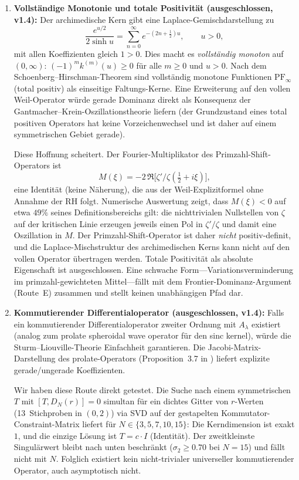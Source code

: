 ﻿\documentclass[12pt,a4paper]{article}
\theoremstyle{definition}
\theoremstyle{remark}
\begin{document}
\begin{enumerate}[label=(\Alph*)]
  \item \textbf{Vollständige Monotonie und totale Positivität (ausgeschlossen, v1.4):} Der archimedische Kern gibt eine Laplace-Gemischdarstellung zu
  \[ \frac{e^{u/2}}{2\sinh u} = \sum_{n=0}^\infty e^{-(2n+\frac{1}{2})u}, \qquad u > 0, \]
  mit allen Koeffizienten gleich $1 > 0$. Dies macht es \emph{vollständig monoton} auf $(0,\infty)$: $(-1)^m k^{(m)}(u) \geq 0$ für alle $m \geq 0$ und $u > 0$. Nach dem Schoenberg--Hirschman-Theorem sind vollständig monotone Funktionen $\mathrm{PF}_\infty$ (total positiv) als einseitige Faltungs-Kerne. Eine Erweiterung auf den vollen Weil-Operator würde gerade Dominanz direkt als Konsequenz der Gantmacher--Krein-Oszillationstheorie liefern (der Grundzustand eines total positiven Operators hat keine Vorzeichenwechsel und ist daher auf einem symmetrischen Gebiet gerade).

  Diese Hoffnung scheitert. Der Fourier-Multiplikator des Primzahl-Shift-Operators ist
  \[ M(\xi) = -2\,\Re\!\bigl[\zeta'/\zeta(\tfrac{1}{2}+i\xi)\bigr], \]
  eine Identität (keine Näherung), die aus der Weil-Explizitformel ohne Annahme der RH folgt. Numerische Auswertung zeigt, dass $M(\xi) < 0$ auf etwa $49\%$ seines Definitionsbereichs gilt: die nichttrivialen Nullstellen von $\zeta$ auf der kritischen Linie erzeugen jeweils einen Pol in $\zeta'/\zeta$ und damit eine Oszillation in $M$. Der Primzahl-Shift-Operator ist daher \emph{nicht} positiv-definit, und die Laplace-Mischstruktur des archimedischen Kerns kann nicht auf den vollen Operator übertragen werden. Totale Positivität als absolute Eigenschaft ist ausgeschlossen. Eine schwache Form---Variationsverminderung im primzahl-gewichteten Mittel---fällt mit dem Frontier-Dominanz-Argument (Route~E) zusammen und stellt keinen unabhängigen Pfad dar.

  \item \textbf{Kommutierender Differentialoperator (ausgeschlossen, v1.4):} Falls ein kommutierender Differentialoperator zweiter Ordnung mit $A_\lambda$ existiert (analog zum prolate spheroidal wave operator für den sinc kernel), würde die Sturm--Liouville-Theorie Einfachheit garantieren. Die Jacobi-Matrix-Darstellung des prolate-Operators (Proposition~3.7 in \cite{ConnesMoscovici2023}) liefert explizite gerade/ungerade Koeffizienten.

  Wir haben diese Route direkt getestet. Die Suche nach einem symmetrischen $T$ mit $[T, D_N(r)] = 0$ simultan für ein dichtes Gitter von $r$-Werten (13~Stichproben in $(0,2)$) via SVD auf der gestapelten Kommutator-Constraint-Matrix liefert für $N \in \{3, 5, 7, 10, 15\}$: Die Kerndimension ist exakt $1$, und die einzige Lösung ist $T = c \cdot I$ (Identität). Der zweitkleinste Singulärwert bleibt nach unten beschränkt ($\sigma_2 \geq 0.70$ bei $N = 15$) und fällt nicht mit $N$. Folglich existiert kein nicht-trivialer universeller kommutierender Operator, auch asymptotisch nicht.


\end{enumerate}
\end{document}
